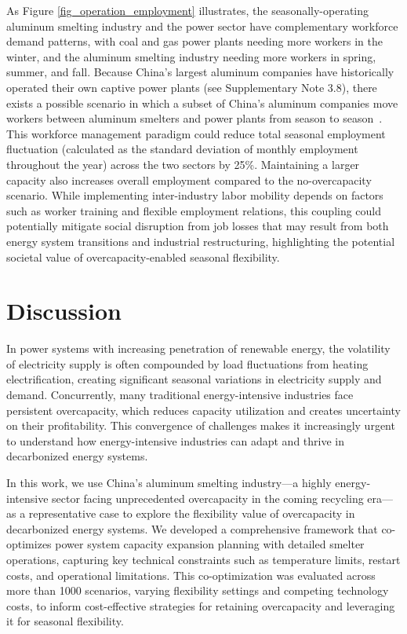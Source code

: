 \documentclass[preprint]{elsarticle}
\begin{document}
As Figure \ref{fig_operation_employment} illustrates, the seasonally-operating aluminum smelting industry and the power sector have complementary workforce demand patterns, with coal and gas power plants needing more workers in the winter, and the aluminum smelting industry needing more workers in spring, summer, and fall. Because China's largest aluminum companies have historically operated their own captive power plants (see Supplementary Note 3.8), there exists a possible scenario in which a subset of China's aluminum companies move workers between aluminum smelters and power plants from season to season~\citep{tan_different_2025}. This workforce management paradigm could reduce total seasonal employment fluctuation (calculated as the standard deviation of monthly employment throughout the year) across the two sectors by 25\%. Maintaining a larger capacity also increases overall employment compared to the no-overcapacity scenario. While implementing inter-industry labor mobility depends on factors such as worker training and flexible employment relations, this coupling could potentially mitigate social disruption from job losses that may result from both energy system transitions and industrial restructuring, highlighting the potential societal value of overcapacity-enabled seasonal flexibility.

\section*{\textbf{Discussion}}

In power systems with increasing penetration of renewable energy, the volatility of electricity supply is often compounded by load fluctuations from heating electrification, creating significant seasonal variations in electricity supply and demand. Concurrently, many traditional energy-intensive industries face persistent overcapacity, which reduces capacity utilization and creates uncertainty on their profitability. This convergence of challenges makes it increasingly urgent to understand how energy-intensive industries can adapt and thrive in decarbonized energy systems.

In this work, we use China's aluminum smelting industry—a highly energy-intensive sector facing unprecedented overcapacity in the coming recycling era—as a representative case to explore the flexibility value of overcapacity in decarbonized energy systems. We developed a comprehensive framework that co-optimizes power system capacity expansion planning with detailed smelter operations, capturing key technical constraints such as temperature limits, restart costs, and operational limitations. This co-optimization was evaluated across more than 1000 scenarios, varying flexibility settings and competing technology costs, to inform cost-effective strategies for retaining overcapacity and leveraging it for seasonal flexibility.
\end{document}
